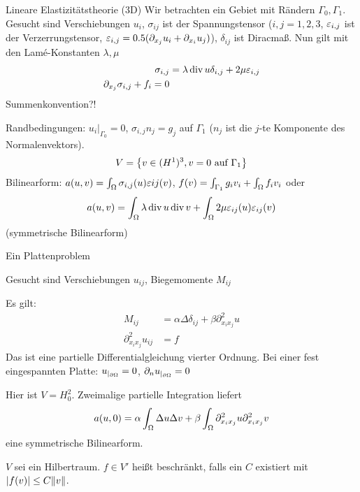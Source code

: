\begin{beispiel} Lineare Elastizitätstheorie (3D)
Wir betrachten ein Gebiet mit Rändern $\Gamma_0, \Gamma_1$. Gesucht sind Verschiebungen $u_i$, $\sigma_{ij}$ ist der Spannungstensor ($i,j = 1, 2, 3$, $\varepsilon_{i,j}$ ist der Verzerrungstensor, $\varepsilon_{i,j} = 0.5 (\partial_{x_j}u_i + \partial_{x_i}u_j)$), $\delta_{ij}$ ist Diracmaß.
Nun gilt mit den Lamé-Konstanten $\lambda, \mu$
\begin{align*}
  \sigma_{i,j} &= \lambda \operatorname{div} u \delta_{i,j} + 2 \mu \varepsilon_{i,j}\\
  \partial_{x_j} \sigma_{i,j} + f_i=0 
\end{align*}
Summenkonvention?!

Randbedingungen: $u_i|_{\Gamma_0} = 0$, $\sigma_{i,j}n_j = g_j$ auf $\Gamma_1$ ($n_j$ ist die $j$-te Komponente des Normalenvektors).
\begin{align*}
  V = \left\{ v \in (H^1)^3, v = 0 \text{ auf } \Gamma_1 \right\}
\end{align*}
Bilinearform: $a(u,v) = \int_\Omega \sigma_{i,j}(u) \varepsilon{ij}(v)$, $f(v)= \int_{\Gamma_1}g_i v_i+ \int_\Omega f_iv_i$
oder 
\begin{align*}
a(u,v) = \int_\Omega \lambda \operatorname{div} u \operatorname{div} v + \int_\Omega2 \mu \varepsilon_{ij}(u)\varepsilon_{ij}(v)
\end{align*}
(symmetrische Bilinearform)
\end{beispiel}

\begin{beispiel}Ein Plattenproblem

Gesucht sind Verschiebungen $u_{ij}$, Biegemomente $M_{ij}$

Es gilt: 
\begin{align*}
  M_{ij} &= \alpha \Delta \delta_{ij} + \beta \partial^2_{x_i x_j} u\\
\partial^2_{x_i x_j} u_{ij} &= f
\end{align*}
  Das ist eine partielle Differentialgleichung vierter Ordnung. Bei einer fest eingespannten Platte:
$u_{|_{\partial \Omega}} = 0$, $\partial_n u_{|_{\partial \Omega}} = 0$

Hier ist $V = H_0^2$. Zweimalige partielle Integration liefert
\begin{align*}
  a(u, 0) = \alpha\int_\Omega \Delta u \Delta v + \beta \int_\Omega \partial^2_{x_i x_j} u \partial^2_{x_i x_j}v
\end{align*}
eine symmetrische Bilinearform.
\end{beispiel}

$V$ sei ein Hilbertraum. $f \in V'$ heißt beschränkt, falls ein $C$ existiert mit $|f(v)|\leq C \|v\|$.


